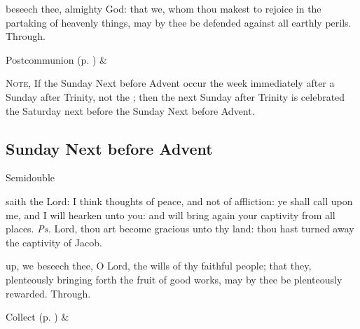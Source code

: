 
\vspace{-0.25\baselineskip}

\postcommunion

\vspace{-0.1\baselineskip}

 beseech thee, almighty God: that we, whom thou makest to rejoice in the partaking of heavenly things, may by thee be defended against all earthly perils. Through.
\begin{rubric}
     Postcommunion  (p. \pageref{SPSaints}) \&  
\end{rubric}

\begin{rubric}
	\textsc{Note,} If the Sunday Next before Advent occur the week immediately after a Sunday after Trinity, not the ; then the next Sunday after Trinity is celebrated the Saturday next before the Sunday Next before Advent.
\end{rubric}


\subsection{Sunday Next before Advent}
\begin{inhead}
{Semidouble}
\end{inhead}


\introit
{} saith the Lord: I think thoughts of peace, and not of affliction: ye shall call upon me, and I will hearken unto you: and will bring again your captivity from all places. \textit{Ps.} Lord, thou art become gracious unto thy land: thou hast turned away the captivity of Jacob.


\collect
{} up, we beseech thee, O Lord, the wills of thy faithful people; that they, plenteously bringing forth the fruit of good works, may by thee be plenteously rewarded. Through.
\begin{rubric}
     Collect  (p. \pageref{SPSaints}) \&  
\end{rubric}

